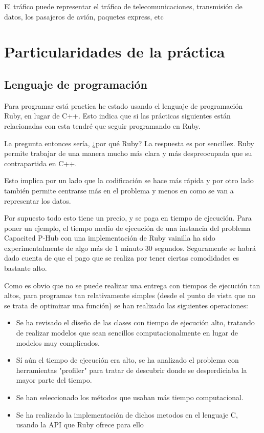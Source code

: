 \documentclass[12pt,a4paper,draft,openany]{article}
\begin{document}
El tráfico puede representar el tráfico de telecomunicaciones, transmisión de datos, los pasajeros de avión, paquetes express, etc

\section{Particularidades de la práctica}
\subsection{Lenguaje de programación}
Para programar está practica he estado usando el lenguaje de programación Ruby, en lugar de C++. Esto indica que si las prácticas siguientes están relacionadas con esta tendré que seguir programando en Ruby.

La pregunta entonces sería, ¿por qué Ruby? La respuesta es por sencillez. Ruby permite trabajar de una manera mucho más clara y más despreocupada que su contrapartida en C++. 

Esto implica por un lado que la codificación se hace más rápida y por otro lado también permite centrarse más en el problema y menos en como se van a representar los datos.

Por supuesto todo esto tiene un precio, y se paga en tiempo de ejecución. Para poner un ejemplo, el tiempo medio de ejecución de una instancia del problema Capacited P-Hub con una implementación de Ruby vainilla ha sido experimentalmente de algo más de 1 minuto 30 segundos.  
Seguramente se habrá dado cuenta de que el pago que se realiza por tener ciertas comodidades es bastante alto.

Como es obvio que no se puede realizar una entrega con tiempos de ejecución tan altos, para programas tan relativamente simples (desde el punto de vista que no se trata de optimizar una función) se han realizado las siguientes operaciones:

\begin{itemize}
\item Se ha revisado el diseño de las clases con tiempo de ejecución alto, tratando de realizar modelos que sean sencillos computacionalmente en lugar de modelos muy complicados.
\item Sí aún el tiempo de ejecución era alto, se ha analizado el problema con herramientas
"profiler" para tratar de descubrir donde se desperdiciaba la mayor parte del tiempo.
\item Se han seleccionado los métodos que usaban más tiempo computacional.
\item Se ha realizado la implementación de dichos metodos en el lenguaje C, usando la
API que Ruby ofrece para ello
\end{itemize}
\end{document}
